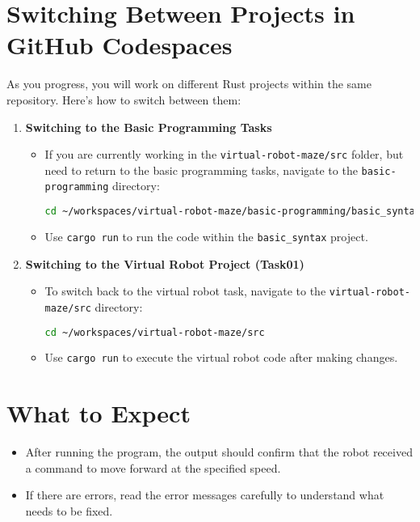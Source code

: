 \documentclass[12pt]{article}
\begin{document}
	\section*{Switching Between Projects in GitHub Codespaces}
	As you progress, you will work on different Rust projects within the same repository. Here's how to switch between them:
	
	\begin{enumerate}
		\item \textbf{Switching to the Basic Programming Tasks}
		\begin{itemize}
			\item If you are currently working in the \texttt{virtual-robot-maze/src} folder, but need to return to the basic programming tasks, navigate to the \texttt{basic-programming} directory:
			\begin{lstlisting}[language=bash]
				cd ~/workspaces/virtual-robot-maze/basic-programming/basic_syntax
			\end{lstlisting}
			\item Use \texttt{cargo run} to run the code within the \texttt{basic\_syntax} project.
		\end{itemize}
		
		\item \textbf{Switching to the Virtual Robot Project (Task01)}
		\begin{itemize}
			\item To switch back to the virtual robot task, navigate to the \texttt{virtual-robot-maze/src} directory:
			\begin{lstlisting}[language=bash]
				cd ~/workspaces/virtual-robot-maze/src
			\end{lstlisting}
			\item Use \texttt{cargo run} to execute the virtual robot code after making changes.
		\end{itemize}
	\end{enumerate}
	
	\section*{What to Expect}
	\begin{itemize}
		\item After running the program, the output should confirm that the robot received a command to move forward at the specified speed.
		\item If there are errors, read the error messages carefully to understand what needs to be fixed.
	\end{itemize}
	
\end{document}
